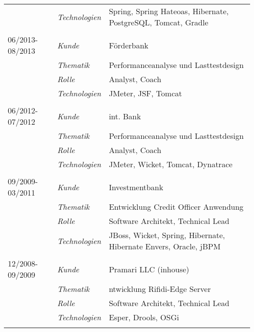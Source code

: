 \begin{longtable}{@{}>{}p{4cm}>{\itshape}p{2cm}>{}p{9cm}}
\nopagebreak        & Technologien  & Spring, Spring Hateoas, Hibernate, PostgreSQL, Tomcat, Gradle\\
\\
06/2013-08/2013     & Kunde         & Förderbank\\
\nopagebreak        & Thematik      & Performanceanalyse und Lasttestdesign\\
\nopagebreak        & Rolle         & Analyst, Coach\\
\nopagebreak        & Technologien  & JMeter, JSF, Tomcat\\
\\
06/2012-07/2012     & Kunde         & int. Bank\\
\nopagebreak        & Thematik      & Performanceanalyse und Lasttestdesign\\
\nopagebreak        & Rolle         & Analyst, Coach\\
\nopagebreak        & Technologien  & JMeter, Wicket, Tomcat, Dynatrace\\
\\
09/2009-03/2011     & Kunde         & Investmentbank\\
\nopagebreak        & Thematik      & Entwicklung Credit Officer Anwendung\\
\nopagebreak        & Rolle         & Software Architekt, Technical Lead\\
\nopagebreak        & Technologien  & JBoss, Wicket, Spring, Hibernate, Hibernate Envers, Oracle, jBPM\\
\\
12/2008-09/2009     & Kunde         & Pramari LLC (inhouse)\\
\nopagebreak        & Thematik      & ntwicklung Rifidi-Edge Server\\
\nopagebreak        & Rolle         & Software Architekt, Technical Lead\\
\nopagebreak        & Technologien  & Esper, Drools, OSGi\\
\\
\end{longtable}
\renewcommand{\arraystretch}{2}
